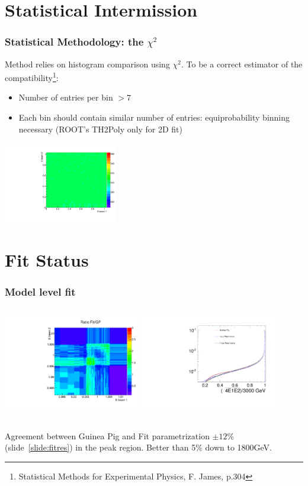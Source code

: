 \documentclass{beamer}
\begin{document}
\section{Statistical Intermission}
\begin{frame}
\frametitle{Statistical Methodology: the $\chi^2$}
Method relies on histogram comparison using $\chi^2$. To be a correct estimator
of the compatibility\footnote{Statistical Methods for 
Experimental Physics, F. James, p.304}:
\begin{itemize}
  \item Number of entries per bin $>7$
  \item Each bin should contain similar number of entries: equiprobability
  binning necessary (ROOT's TH2Poly only for 2D fit)
\end{itemize}
\begin{center}
\includegraphics[width=5cm]{Th2PolyRef.pdf}
\end{center}
\end{frame}

\section{Fit Status}
\begin{frame}
\frametitle{Model level fit}
\begin{columns}[c]
\column{6cm}
\includegraphics[width=6cm]{Ratio_Fit_vs_GP_FCAL.pdf}
\column{6cm}
\includegraphics[width=6cm,page=2]{res_FCAL.pdf}
\end{columns}
Agreement between Guinea Pig and Fit parametrization $\pm12\%$
(slide~\ref{slide:fitres}) in the peak region. Better than 5\% down to 1800GeV.
\end{frame}
\end{document}
